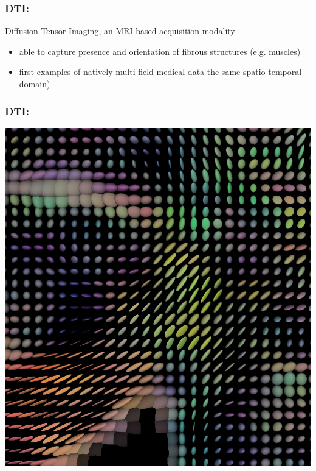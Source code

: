 \documentclass{beamer}
\begin{document}
\begin{frame}
	\frametitle{DTI:} %
	Diffusion Tensor Imaging, an MRI-based acquisition modality
	\begin{itemize}
		\item able to capture presence and orientation of fibrous structures
(e.g. muscles)
		\item first examples of natively multi-field medical data %
the same spatio temporal domain)
	\end{itemize}
\end{frame}

\begin{frame}
	\frametitle{DTI:}
	\includegraphics[width=\textwidth]{images/dti}
\end{frame}
\end{document}
